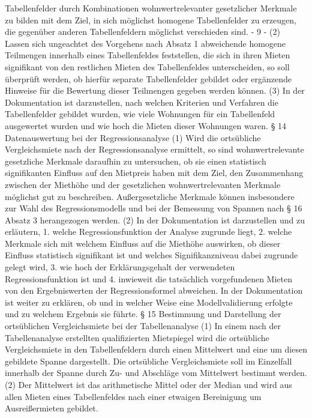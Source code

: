 Tabellenfelder durch Kombinationen wohnwertrelevanter gesetzlicher Merkmale zu bilden
mit dem Ziel, in sich möglichst homogene Tabellenfelder zu erzeugen, die gegenüber anderen Tabellenfeldern möglichst verschieden sind.
- 9 -
(2) Lassen sich ungeachtet des Vorgehens nach Absatz 1 abweichende homogene
Teilmengen innerhalb eines Tabellenfeldes feststellen, die sich in ihren Mieten signifikant
von den restlichen Mieten des Tabellenfeldes unterscheiden, so soll überprüft werden, ob
hierfür separate Tabellenfelder gebildet oder ergänzende Hinweise für die Bewertung dieser Teilmengen gegeben werden können.
(3) In der Dokumentation ist darzustellen, nach welchen Kriterien und Verfahren die
Tabellenfelder gebildet wurden, wie viele Wohnungen für ein Tabellenfeld ausgewertet wurden und wie hoch die Mieten dieser Wohnungen waren.
§ 14
Datenauswertung bei der Regressionsanalyse
(1) Wird die ortsübliche Vergleichsmiete nach der Regressionsanalyse ermittelt, so
sind wohnwertrelevante gesetzliche Merkmale daraufhin zu untersuchen, ob sie einen statistisch signifikanten Einfluss auf den Mietpreis haben mit dem Ziel, den Zusammenhang
zwischen der Miethöhe und der gesetzlichen wohnwertrelevanten Merkmale möglichst gut
zu beschreiben. Außergesetzliche Merkmale können insbesondere zur Wahl des Regressionsmodells und bei der Bemessung von Spannen nach § 16 Absatz 3 herangezogen werden.
(2) In der Dokumentation ist darzustellen und zu erläutern,
1. welche Regressionsfunktion der Analyse zugrunde liegt,
2. welche Merkmale sich mit welchem Einfluss auf die Miethöhe auswirken, ob dieser
Einfluss statistisch signifikant ist und welches Signifikanzniveau dabei zugrunde gelegt
wird,
3. wie hoch der Erklärungsgehalt der verwendeten Regressionsfunktion ist und
4. inwieweit die tatsächlich vorgefundenen Mieten von den Ergebniswerten der Regressionsformel abweichen.
In der Dokumentation ist weiter zu erklären, ob und in welcher Weise eine Modellvalidierung
erfolgte und zu welchem Ergebnis sie führte.
§ 15
Bestimmung und Darstellung der ortsüblichen Vergleichsmiete bei der Tabellenanalyse
(1) In einem nach der Tabellenanalyse erstellten qualifizierten Mietspiegel wird die
ortsübliche Vergleichsmiete in den Tabellenfeldern durch einen Mittelwert und eine um diesen gebildete Spanne dargestellt. Die ortsübliche Vergleichsmiete soll im Einzelfall innerhalb der Spanne durch Zu- und Abschläge vom Mittelwert bestimmt werden.
(2) Der Mittelwert ist das arithmetische Mittel oder der Median und wird aus allen Mieten eines Tabellenfeldes nach einer etwaigen Bereinigung um Ausreißermieten gebildet.
